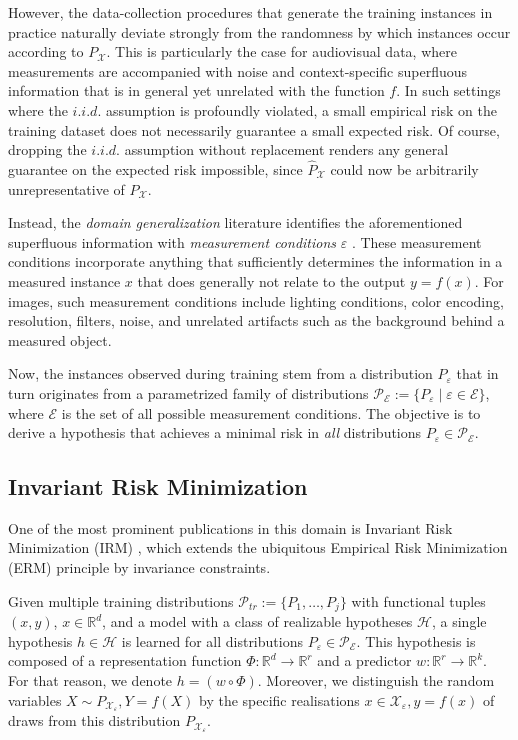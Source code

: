 However, the data-collection procedures that generate the training instances in practice naturally deviate strongly from the randomness by which instances occur according to $P_{\mathcal{X}}$.
This is particularly the case for audiovisual data, where measurements are accompanied with noise and context-specific superfluous information that is in general yet unrelated with the function $f$.
In such settings where the $i.i.d.$ assumption is profoundly violated, a small empirical risk on the training dataset does not necessarily guarantee a small expected risk.
Of course, dropping the $i.i.d.$ assumption without replacement renders any general guarantee on the expected risk impossible, since $\hat{P}_{\mathcal{X}}$ could now be arbitrarily unrepresentative of $P_{\mathcal{X}}$.

Instead, the \textit{domain generalization} literature identifies the aforementioned superfluous information with \textit{measurement conditions} $\varepsilon$ \cite{wang2022generalizing}.
These measurement conditions incorporate anything that sufficiently determines the information in a measured instance $x$ that does generally not relate to the output $y=f(x)$.       
For images, such measurement conditions include lighting conditions, color encoding, resolution, filters, noise, and unrelated artifacts such as the background behind a measured object.

Now, the instances observed during training stem from a distribution $P_\varepsilon$ that in turn originates from a parametrized family of distributions $\mathcal{P}_{\mathcal{E}}:=\{P_{\varepsilon}\mid \varepsilon\in \mathcal{E}\}$, where $\mathcal{E}$ is the set of all possible measurement conditions.
The objective is to derive a hypothesis that achieves a minimal risk in \textit{all} distributions $P_{\varepsilon}\in\mathcal{P}_{\mathcal{E}}$.

\subsection{Invariant Risk Minimization}
One of the most prominent publications in this domain is Invariant Risk Minimization (IRM) \cite{arjovsky2019invariant}, which extends the ubiquitous Empirical Risk Minimization (ERM) principle \cite{vapnik1991principles} by invariance constraints.

Given multiple training distributions $\mathcal{P}_{tr}:=\{P_{1},\dots,P_{j}\}$ with functional tuples $(x,y)$, $x\in\mathbb{R}^d$, and a model with a class of realizable hypotheses $\mathcal{H}$, a single hypothesis $h\in\mathcal{H}$ is learned for all distributions $P_{\varepsilon}\in\mathcal{P}_{\mathcal{E}}$.
This hypothesis is composed of a representation function $\Phi:\mathbb{R}^d\to\mathbb{R}^{r}$ and a predictor $w:\mathbb{R}^r\to\mathbb{R}^{k}$. For that reason, we denote $h=(w\circ \Phi)$.
Moreover, we distinguish the random variables $X\sim P_{\mathcal{X}_{\varepsilon}},Y=f(X)$ by the specific realisations $x\in\mathcal{X}_{\varepsilon},y=f(x)$ of draws from this distribution $P_{\mathcal{X}_{\varepsilon}}$.

